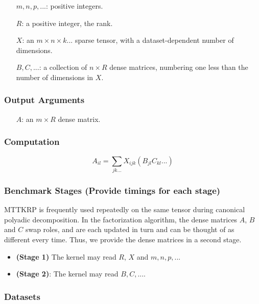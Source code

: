 \documentclass{article}
\begin{document}
\begin{itemize}
	\item[$m, n, p, ...$:] positive integers.
	\item[$R$:] a positive integer, the rank.
	\item[$X$:] an $m \times n \times k ...$ sparse tensor, with a dataset-dependent number of dimensions.
	\item[$B, C, ...$:] a collection of $n \times R$ dense matrices, numbering one less than the number of dimensions in $X$.
\end{itemize}

\subsubsection{Output Arguments}

\begin{itemize}
	\item[$A$:] an $m \times R$ dense matrix.
\end{itemize}

\subsubsection{Computation}

$$A_{il} = \sum_{jk...}X_{ijk}(B_{jl}C_{kl}...)$$

\subsubsection{Benchmark Stages (Provide timings for each stage)}

MTTKRP is frequently used repeatedly on the same tensor during canonical polyadic decomposition. In the factorization algorithm, the dense matrices $A$, $B$ and $C$ swap roles, and are each updated in turn and can be thought of as different every time. Thus, we provide the dense matrices in a second stage.

\begin{itemize}
\item \textbf{(Stage 1)}
	The kernel may read $R$, $X$ and $m, n, p, ...$
\item \textbf{(Stage 2)}:
	The kernel may read $B, C, ...$.
\end{itemize}

\subsubsection{Datasets}
\end{document}
